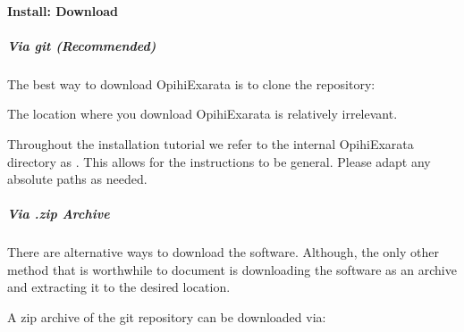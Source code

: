 \documentclass[letterpaper,11pt,english]{sphinxmanual}
\begin{document}
\sphinxstepscope


\paragraph{Install: Download}
\label{\detokenize{technical/installation/download:install-download}}\label{\detokenize{technical/installation/download:technical-installation-download}}\label{\detokenize{technical/installation/download::doc}}

\subparagraph{Via git (Recommended)}
\label{\detokenize{technical/installation/download:via-git-recommended}}
\sphinxAtStartPar
The best way to download OpihiExarata is to clone the repository:

\begin{sphinxVerbatim}[commandchars=\\\{\}]
  
\end{sphinxVerbatim}

\sphinxAtStartPar
The location where you download OpihiExarata is relatively irrelevant.

\sphinxAtStartPar
Throughout the installation tutorial we refer to the internal OpihiExarata
directory as . This allows for the instructions to be general.
Please adapt any absolute paths as needed.


\subparagraph{Via .zip Archive}
\label{\detokenize{technical/installation/download:via-zip-archive}}
\sphinxAtStartPar
There are alternative ways to download the software. Although, the only other
method that is worthwhile to document is downloading the software as an
archive and extracting it to the desired location.

\sphinxAtStartPar
A zip archive of the git repository can be downloaded via:

\begin{sphinxVerbatim}[commandchars=\\\{\}]
   
 
  
 
\end{sphinxVerbatim}
\end{document}
